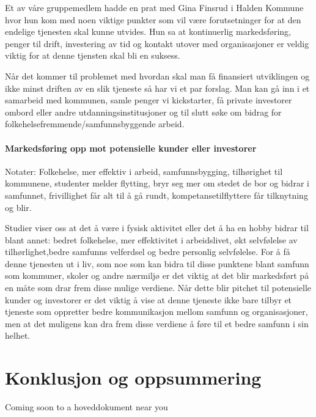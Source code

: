 Et av våre gruppemedlem hadde en prat med Gina Finsrud i Halden Kommune hvor hun kom med noen viktige punkter som vil være forutsetninger for at den endelige tjenesten skal kunne utvides. Hun sa at kontinuerlig markedsføring, penger til drift, investering av tid og kontakt utover med organisasjoner er veldig viktig for at denne tjensten skal bli en suksess.\cite{KOMMUNEN-INTERVJU:20} 

Når det kommer til problemet med hvordan skal man få finansiert utviklingen og ikke minst driften av en slik tjeneste så har vi et par forslag. Man kan gå inn i et samarbeid med kommunen, samle penger vi kickstarter, få private investorer ombord eller andre utdanningsinstitusjoner og til slutt søke om bidrag for folkehelsefremmende/samfunnsbyggende arbeid.




\paragraph{Markedsføring opp mot potensielle kunder eller investorer}
Notater:
Folkehelse, mer effektiv i arbeid, samfunnsbygging, tilhørighet til kommunene, studenter melder flytting, bryr seg mer om stedet de bor og bidrar i samfunnet, frivillighet får alt til å gå rundt, kompetansetilflyttere får tilknytning og blir.

Studier viser oss at det å være i fysisk aktivitet eller det å ha en hobby bidrar til blant annet: bedret folkehelse, mer effektivitet i arbeidslivet, økt selvfølelse av tilhørlighet,bedre samfunns velferdsel og bedre personlig selvfølelse. For å få denne tjenesten ut i liv, som noe som kan bidra til disse punktene blant samfunn som kommuner, skoler og andre nærmiljø er det viktig at det blir markedsført på en måte som drar frem disse mulige verdiene. Når dette blir pitchet til potensielle kunder og investorer er det viktig å vise at denne tjeneste ikke bare tilbyr et tjeneste som oppretter bedre kommunikasjon mellom samfunn og organisasjoner, men at det muligens kan dra frem disse verdiene å føre til et bedre samfunn i sin helhet.


\section{Konklusjon og oppsummering}
Coming soon to a hoveddokument near you






